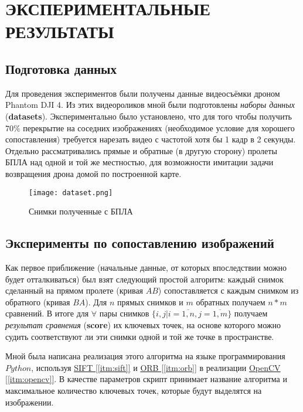 \chapter{ЭКСПЕРИМЕНТАЛЬНЫЕ РЕЗУЛЬТАТЫ}

\section{Подготовка данных}

Для проведения экспериментов были получены данные видеосъёмки дроном Phantom DJI 4. Из этих видеороликов мной были подготовлены \textit{наборы данных} (\textbf{datasets}). Экспериментально было установлено, что для того чтобы получить $70\%$ перекрытие на соседних изображениях (необходимое условие для хорошего сопоставления) требуется нарезать видео с частотой хотя бы 1 кадр в 2 секунды. Отдельно рассматривались прямые и обратные (в другую сторону) пролеты БПЛА над одной и той же местностью, для возможности имитации задачи возвращения дрона домой по построенной карте.

\begin{figure}[h]
    \centering
    \texttt{[image: dataset.png]}
    \caption{Снимки полученные с БПЛА}
    \label{fig:dataset}
\end{figure}

\section{Эксперименты по сопоставлению изображений}

Как первое приближение (начальные данные, от которых впоследствии можно будет отталкиваться) был взят следующий простой алгоритм: каждый снимок сделанный на прямом пролете (кривая $AB$) сопоставляется с каждым снимком из обратного (кривая $BA$). Для $n$ прямых снимков и $m$ обратных получаем $n*m$ сравнений. В итоге для $\forall$ пары снимков $\{i, j | i=\overline{1,n}, j=\overline{1,m}\}$ получаем \textit{результат сравнения} (\textbf{score}) их ключевых точек, на основе которого можно судить соответствуют ли эти снимки одной и той же точке в пространстве.

Мной была написана реализация этого алгоритма на языке программирования $Python$, используя \hyperref[itm:sift]{SIFT [\ref{itm:sift}]} и \hyperref[itm:orb]{ORB [\ref{itm:orb}]} в реализации \hyperref[itm:opencv]{OpenCV [\ref{itm:opencv}]}. В качестве параметров скрипт принимает название алгоритма и максимальное количество ключевых точек, которые будут выделятся на изображении.

